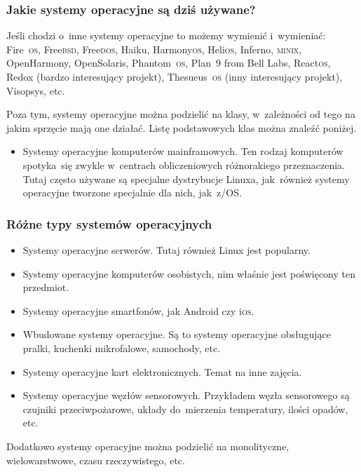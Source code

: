 \documentclass[10pt,t]{beamer}
\begin{document}
\begin{frame}
  \frametitle{Jakie systemy operacyjne są dziś używane?}


  Jeśli chodzi o~inne systemy operacyjne to możemy wymienić i~wymieniać:
  Fire~\textsc{os}, Free\textsc{bsd}, Free\textsc{dos}, Haiku,
  Harmony\textsc{os}, Heli\textsc{os}, Inferno, \textsc{minix},
  OpenHarmony, OpenSolaris, Phantom~\textsc{os}, Plan~9
  from Bell Labs, React\textsc{os}, Redox (bardzo interesujący projekt),
  Thesueus~\textsc{os} (inny interesujący projekt), Visopsys, etc.

  Poza tym, systemy operacyjne można podzielić na klasy, w~zależności od
  tego na jakim sprzęcie mają one działać. Listę podstawowych klas można
  znaleźć poniżej.

  \begin{itemize}

  \item Systemy operacyjne komputerów mainframowych. Ten rodzaj komputerów
    spotyka~się zwykle w~centrach obliczeniowych różnorakiego
    przeznaczenia. Tutaj często używane są specjalne dystrybucje Linuxa,
    jak~również systemy operacyjne tworzone specjalnie dla nich, jak~z/OS.

  \end{itemize}

\end{frame}





\begin{frame}
  \frametitle{Różne typy systemów operacyjnych}


  \begin{itemize}

  \item Systemy operacyjne serwerów. Tutaj również Linux jest popularny.

  \item Systemy operacyjne komputerów osobistych, nim właśnie jest
    poświęcony ten przedmiot.

  \item Systemy operacyjne smartfonów, jak Android czy i\textsc{os}.

  \item Wbudowane systemy operacyjne. Są to systemy operacyjne obsługujące
    pralki, kuchenki mikrofalowe, samochody, etc.

  \item Systemy operacyjne kart elektronicznych. Temat na inne zajęcia.

  \item Systemy operacyjne węzłów sensorowych. Przykładem węzła sensorowego
    są czujniki przeciwpożarowe, układy do~mierzenia temperatury, ilości
    opadów, etc.

  \end{itemize}

  Dodatkowo systemy operacyjne można podzielić na monolityczne,
  wielowarstwowe, czasu rzeczywistego, etc.

\end{frame}
\end{document}
